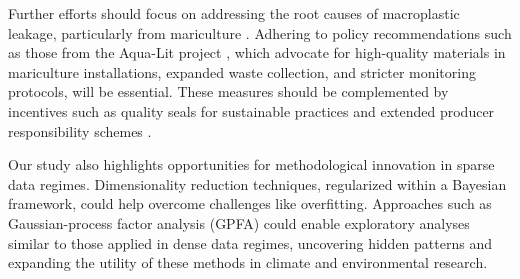 Further efforts should focus on addressing the root causes of macroplastic leakage, particularly from mariculture \cite{tian_can_2022}. Adhering to policy recommendations such as those from the Aqua-Lit project \cite{hipolito_policy_2020}, which advocate for high-quality materials in mariculture installations, expanded waste collection, and stricter monitoring protocols, will be essential. These measures should be complemented by incentives such as quality seals for sustainable practices \cite{redacuiculturaplastic_creacion_2022, skirtun_plastic_2022} and extended producer responsibility schemes \cite{leal_filho_overview_2019}.

Our study also highlights opportunities for methodological innovation in sparse data regimes. Dimensionality reduction techniques, regularized within a Bayesian framework, could help overcome challenges like overfitting. Approaches such as Gaussian-process factor analysis (GPFA) \cite{yu_gaussian-process_2008,luttinen_variational_2009} could enable exploratory analyses similar to those applied in dense data regimes, uncovering hidden patterns and expanding the utility of these methods in climate and environmental research.
